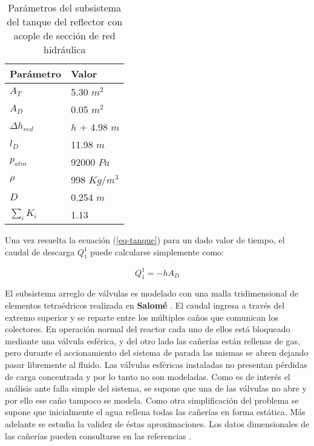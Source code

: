 \begin{table}[]
\centering
\begin{tabular}{|l|l|}
\hline
Parámetro        & Valor          \\ \hline
$A_T$            & 5.30 $m^2$     \\ \hline
$A_D$            & 0.05 $m^2$     \\ \hline
$\Delta h_{red}$ & $h$ + 4.98 $m$ \\ \hline
$l_D$            & 11.98 $m$      \\ \hline
$p_{atm}$        & 92000 $Pa$     \\ \hline
$\rho$           & 998 $Kg/m^3$   \\ \hline
$D$              & 0.254 $m$      \\ \hline
$\sum_i K_i$     & 1.13           \\ \hline
\end{tabular}
\caption{Parámetros del subsistema del tanque del reflector con acople de sección de red hidráulica}
\label{tabla-tanque}
\end{table}

Una vez resuelta la ecuación (\ref{eq-tanque}) para un dado valor de tiempo,
el caudal de descarga $Q_1^1$ puede calcularse simplemente como:

\begin{equation}
Q_1^1 = -\dot{h} A_D
\label{eq-qd}
\end{equation}

El subsistema arreglo de válvulas es modelado con una malla tridimensional de elementos tetraédricos realizada en \textbf{Salomé} \cite{salome}.
El caudal ingresa a través del extremo superior y se reparte entre los múltiples caños que comunican los colectores.
En operación normal del reactor cada uno de ellos está bloqueado mediante una válvula esférica,
y del otro lado las cañerías están rellenas de gas,
pero durante el accionamiento del sistema de parada las mismas se abren dejando pasar libremente al fluido.
Las válvulas esféricas instaladas no presentan pérdidas de carga concentrada y por lo tanto no son modeladas.
Como es de interés el análisis ante falla simple del sistema,
se supone que una de las válvulas no abre y por ello ese caño tampoco se modela.
Como otra simplificación del problema se supone que inicialmente el agua rellena todas las cañerías en forma estática.
Más adelante se estudia la validez de éstas aproximaciones.
Los datos dimensionales de las cañerías pueden consultarse en las referencias \cite{invap-mockup}.

